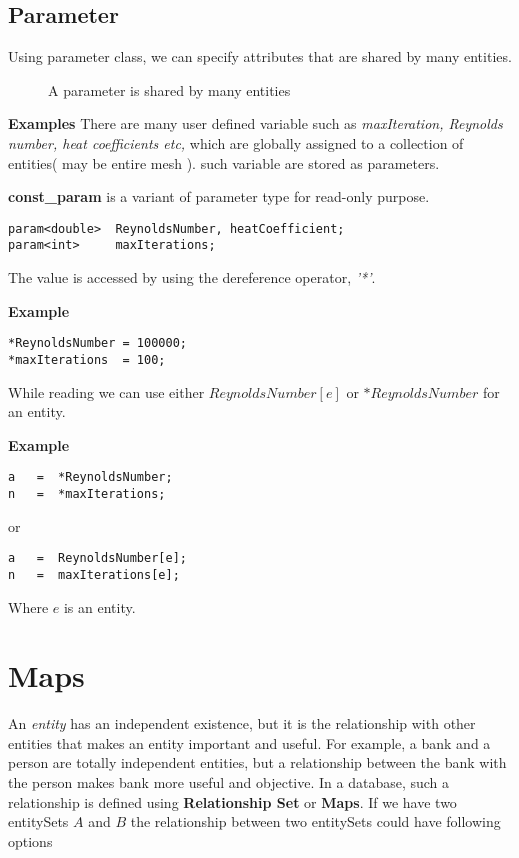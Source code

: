 \subsection{Parameter}
Using parameter class, we can specify attributes that are shared by many entities.
%
\begin{figure}[h]
\vspace{1.8in}\caption { A parameter is shared by many entities }
\label{FigParameter}
\end{figure}
%
\par {\bf Examples } There are many user defined variable such as {\em maxIteration,
Reynolds number, heat coefficients etc,} which are globally assigned to a collection
of entities( may be entire mesh ). such variable are stored as parameters.
\par {\bf const\_param } is a variant of parameter type for read-only purpose.
\begin{verbatim}
param<double>  ReynoldsNumber, heatCoefficient;
param<int>     maxIterations;
\end{verbatim}
The value is accessed by using the dereference operator, {\em'*'}.
\par {\bf Example }
\begin{verbatim}
*ReynoldsNumber = 100000;
*maxIterations  = 100;
\end{verbatim}

\par While reading we can use either $ReynoldsNumber[e]$ or $*ReynoldsNumber$ for an entity.
\par {\bf Example }
\begin{verbatim}
a   =  *ReynoldsNumber;
n   =  *maxIterations;
\end{verbatim}
or
\begin{verbatim}
a   =  ReynoldsNumber[e];
n   =  maxIterations[e];
\end{verbatim}
\par Where $e$ is an entity.
\section  { Maps }
An {\em entity} has an independent existence, but it is the relationship 
with other entities that makes an entity important and useful. For example,
a bank and a person are totally independent entities, but a relationship between
the bank with the person makes bank more useful and objective. In a database,
such a relationship is defined using {\bf Relationship Set} or {\bf Maps}. 
If we have two entitySets $A$ and $B$ the relationship between two entitySets
could have following options

